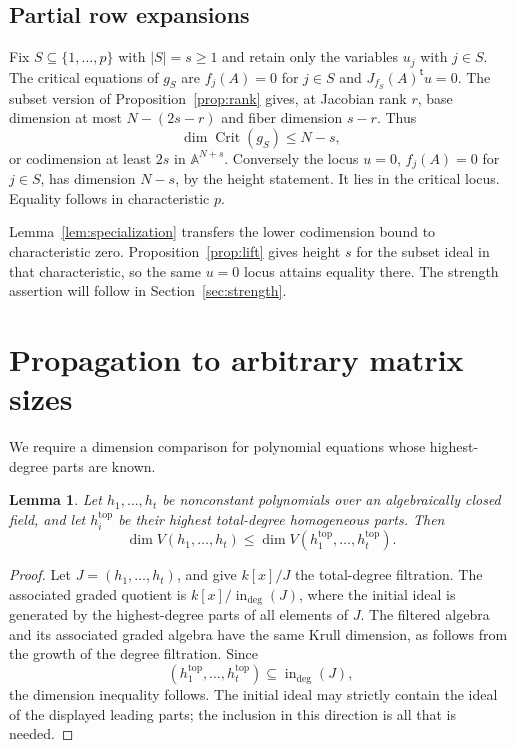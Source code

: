 \documentclass[11pt]{article}
\newtheorem{lemma}[theorem]{Lemma}
\theoremstyle{definition}\newtheorem{definition}[theorem]{Definition}
\theoremstyle{remark}\newtheorem{remark}[theorem]{Remark}
\DeclareMathOperator{\Crit}{Crit}
\newcommand{\A}{\mathbb A}
\numberwithin{equation}{section}
\begin{document}
\subsection{Partial row expansions}
Fix $S\subseteq\{1,\ldots,p\}$ with $|S|=s\ge1$ and retain only
the variables $u_j$ with $j\in S$. The critical equations of $g_S$
are $f_j(A)=0$ for $j\in S$ and $J_{f_S}(A)^{\mathsf t}u=0$.
The subset version of Proposition~\ref{prop:rank} gives, at
Jacobian rank $r$, base dimension at most $N-(2s-r)$ and fiber
dimension $s-r$. Thus
\[
 \dim\Crit(g_S)\le N-s,
\]
or codimension at least $2s$ in $\A^{N+s}$.
Conversely the locus $u=0$, $f_j(A)=0$ for $j\in S$, has dimension
$N-s$, by the height statement. It lies in the critical locus.
Equality follows in characteristic $p$.

Lemma~\ref{lem:specialization} transfers the lower codimension
bound to characteristic zero. Proposition~\ref{prop:lift} gives
height $s$ for the subset ideal in that characteristic, so the
same $u=0$ locus attains equality there. The strength assertion
will follow in Section~\ref{sec:strength}.

\section{Propagation to arbitrary matrix sizes}
We require a dimension comparison for polynomial equations whose
highest-degree parts are known.

\begin{lemma}\label{lem:leading}
Let $h_1,\ldots,h_t$ be nonconstant polynomials over an algebraically
closed field, and let $h_i^{\mathrm{top}}$ be their highest
total-degree homogeneous parts. Then
\begin{equation}\label{eq:leading}
 \dim V(h_1,\ldots,h_t)
 \le\dim V(h_1^{\mathrm{top}},\ldots,h_t^{\mathrm{top}}).
\end{equation}
\end{lemma}
\begin{proof}
Let $J=(h_1,\ldots,h_t)$, and give $k[x]/J$ the total-degree
filtration. The associated graded quotient is
$k[x]/\operatorname{in}_{\deg}(J)$, where the initial ideal is
generated by the highest-degree parts of all elements of $J$.
The filtered algebra and its associated graded algebra have the
same Krull dimension, as follows from the growth of the degree
filtration. Since
\[
 (h_1^{\mathrm{top}},\ldots,h_t^{\mathrm{top}})
   \subseteq\operatorname{in}_{\deg}(J),
\]
the dimension inequality follows. The initial ideal may strictly
contain the ideal of the displayed leading parts; the inclusion in
this direction is all that is needed.
\end{proof}
\end{document}
